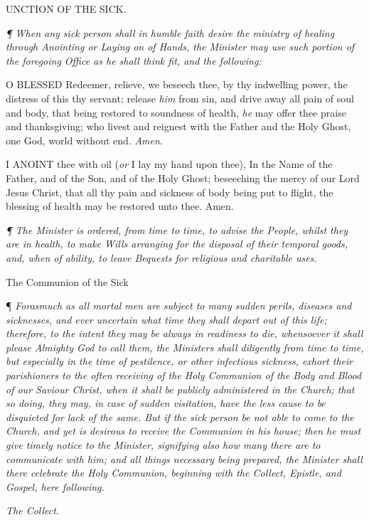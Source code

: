 UNCTION OF THE SICK.

\emph{¶
When any sick person shall in humble faith desire the ministry of healing
through Anointing or Laying on of Hands, the Minister may use such portion
of the foregoing Office as he shall think fit, and the following:}

O
BLESSED Redeemer, relieve, we beseech thee, by thy indwelling power,
the distress of this thy servant; release \emph{him} from sin, and
drive away all pain of soul and body, that being restored to soundness
of health, \emph{he} may offer thee praise and thanksgiving; who livest
and reignest with the Father and the Holy Ghost, one God, world without
end. \emph{Amen}.

I
ANOINT thee with oil (\emph{or} I lay my hand upon thee), In the Name
of the Father, and of the Son, and of the Holy Ghost; beseeching the
mercy of our Lord Jesus Christ, that all thy pain and sickness of body
being put to flight, the blessing of health may be restored unto thee.
Amen.

\emph{¶
The Minister is ordered, from time to time, to advise the People, whilst
they are in health, to make Wills arranging for the disposal of their
temporal goods, and, when of ability, to leave Bequests for religious
and charitable uses.}

\emph{}

The
Communion of the Sick

¶ \emph{Forasmuch as all mortal men are subject to many sudden perils,
diseases and sicknesses, and ever uncertain what time they shall depart
out of this life; therefore, to the intent they may be always in readiness
to die, whensoever it shall please Almighty God to call them, the Ministers
shall diligently from time to time, but especially in the time of pestilence,
or other infectious sickness, exhort their parishioners to the often
receiving of the Holy Communion of the Body and Blood of our Saviour
Christ, when it shall be publicly administered in the Church; that so
doing, they may, in case of sudden visitation, have the less cause to
be disquieted for lack of the same. But if the sick person be not able
to come to the Church, and yet is desirous to receive the Communion
in his house; then he must give timely notice to the Minister, signifying
also how many there are to communicate with him; and all things necessary
being prepared, the Minister shall there celebrate the Holy Communion,
beginning with the Collect, Epistle, and Gospel, here following.}

\emph{The
Collect.}

